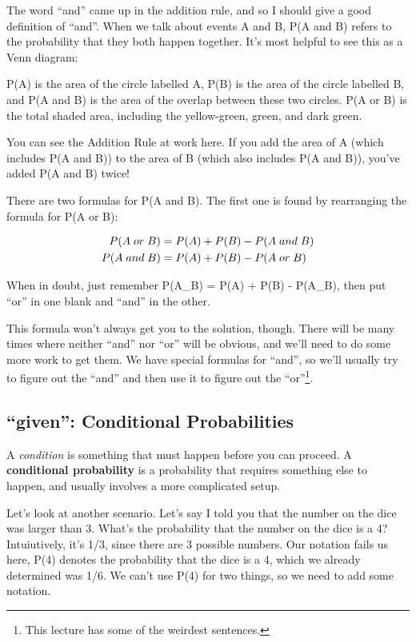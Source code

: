 \documentclass[
  letterpaper,
  DIV=11,
  numbers=noendperiod,
  oneside]{scrreprt}
\begin{document}
The word ``and'' came up in the addition rule, and so I should give a
good definition of ``and''. When we talk about events A and B, P(A and
B) refers to the probability that they both happen together. It's most
helpful to see this as a Venn diagram:

P(A) is the area of the circle labelled A, P(B) is the area of the
circle labelled B, and P(A and B) is the area of the overlap between
these two circles. P(A or B) is the total shaded area, including the
yellow-green, green, and dark green.

You can see the Addition Rule at work here. If you add the area of A
(which includes P(A and B)) to the area of B (which also includes P(A
and B)), you've added P(A and B) twice!

There are two formulas for P(A and B). The first one is found by
rearranging the formula for P(A or B):

\begin{align*}
\small P(A\; or\; B) &\small = P(A) + P(B) - P(A \;and\; B)\\
\small P(A\; and\; B) &\small = P(A) + P(B) - P(A \;or\; B)
\end{align*}

When in doubt, just remember P(A\_B) = P(A) + P(B) - P(A\_B), then put
``or'' in one blank and ``and'' in the other.

This formula won't always get you to the solution, though. There will be
many times where neither ``and'' nor ``or'' will be obvious, and we'll
need to do some more work to get them. We have special formulas for
``and'', so we'll usually try to figure out the ``and'' and then use it
to figure out the ``or''\footnote{This lecture has some of the weirdest
  sentences.}.

\hypertarget{given-conditional-probabilities}{%
\subsection{``given'': Conditional
Probabilities}\label{given-conditional-probabilities}}

A \emph{condition} is something that must happen before you can proceed.
A \textbf{conditional probability} is a probability that requires
something else to happen, and usually involves a more complicated setup.

Let's look at another scenario. Let's say I told you that the number on
the dice was larger than 3. What's the probability that the number on
the dice is a 4? Intuiutively, it's 1/3, since there are 3 possible
numbers. Our notation fails us here, P(4) denotes the probability that
the dice is a 4, which we already determined was 1/6. We can't use P(4)
for two things, so we need to add some notation.
\end{document}

